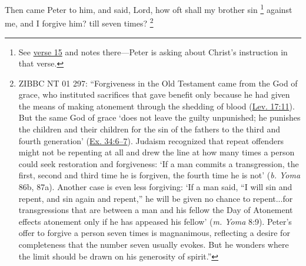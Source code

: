 			Then came Peter to him, and said, Lord, how oft shall my brother sin%
				\footnote{%
					See \hyperref[MATTHEW-18-15]{verse 15} and notes there---Peter is asking about Christ's instruction in that verse.
					}
			against me, and I forgive him? till seven times?%
				\footnote{%
					ZIBBC NT 01 297: ``Forgiveness in the Old Testament came from the God of grace, who instituted sacrifices that gave benefit only because he had given the means of making atonement through the shedding of blood (\hyperref[LEVITICUS-17-11]{Lev. 17:11}). But the same God of grace `does not leave the guilty unpunished; he punishes the children and their children for the sin of the fathers to the third and fourth generation' (\hyperref[EXODUS-34-6]{Ex. 34:6--7}). Judaism recognized that repeat offenders might not be repenting at all and drew the line at how many times a person could seek restoration and forgiveness: `If a man commits a transgression, the first, second and third time he is forgiven, the fourth time he is not' (\textit{b. Yoma} 86b, 87a). Another case is even less forgiving: `If a man said, ``I will sin and repent, and sin again and repent,'' he will be given no chance to repent...for transgressions that are between a man and his fellow the Day of Atonement effects atonement only if he has appeased his fellow' (\textit{m. Yoma} 8:9). Peter's offer to forgive a person seven times is magnanimous, reflecting a desire for completeness that the number seven usually evokes. But he wonders where the limit should be drawn on his generosity of spirit.''
					}

			\begin{framed}
			\scriptsize
				\begin{compactdesc}
					\item[SBLG] 
				\end{compactdesc}
			\end{framed}

